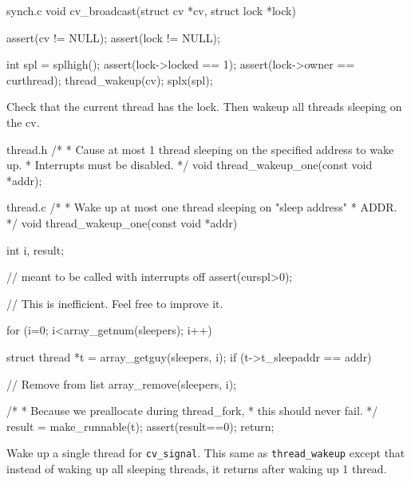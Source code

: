 \documentclass[10pt]{article}
\begin{document}
\begin{codefile}{synch.c}
void
cv_broadcast(struct cv *cv, struct lock *lock)
{
    assert(cv != NULL);
    assert(lock != NULL);

    int spl = splhigh();
    assert(lock->locked == 1);
    assert(lock->owner == curthread);
    thread_wakeup(cv);
    splx(spl);
}
\end{codefile}
Check that the current thread has the lock. Then wakeup all threads sleeping on the cv.\\


\begin{codefile}{thread.h}
/*
 * Cause at most 1 thread sleeping on the specified address to wake up.
 * Interrupts must be disabled.
 */
void thread_wakeup_one(const void *addr);
\end{codefile}

\begin{codefile}{thread.c}
/*
 * Wake up at most one thread sleeping on "sleep address"
 * ADDR.
 */
void
thread_wakeup_one(const void *addr)
{
    int i, result;

    // meant to be called with interrupts off
    assert(curspl>0);

    // This is inefficient. Feel free to improve it.

    for (i=0; i<array_getnum(sleepers); i++) {
        struct thread *t = array_getguy(sleepers, i);
        if (t->t_sleepaddr == addr) {

            // Remove from list
            array_remove(sleepers, i);

            /*
             * Because we preallocate during thread_fork,
             * this should never fail.
             */
            result = make_runnable(t);
            assert(result==0);
            return;
        }
    }
}
\end{codefile}
Wake up a single thread for \verb|cv_signal|. This same as \verb|thread_wakeup| except that instead of
waking up all sleeping threads, it returns after waking up 1 thread.
\end{document}
